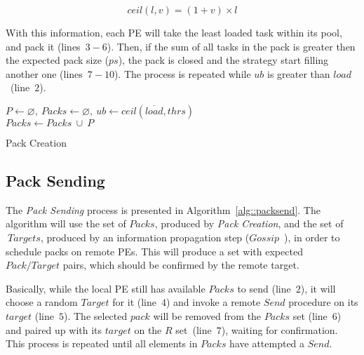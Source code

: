 \begin{equation}
	ceil(l,v) = (1+v)\times l
    \label{eq:ceil}
\end{equation}

With this information, each PE will take the least loaded task within its pool, and pack it (lines~$3-6$). %
Then, if the sum of all tasks in the pack is greater then the expected pack size ($ps$), the pack is closed and the strategy start filling another one (lines~$7-10$).
The process is repeated while $ub$ is greater than $load$~(line~$2$).

\begin{algorithm}[!ht]
    \DontPrintSemicolon
    $P \gets \varnothing,\ Packs \gets \varnothing,\ ub \gets ceil(\overline{load},thrs)$ \\
    $Packs \gets Packs\ \cup\ P$   
    \caption{Pack Creation} 
    \label{alg::packcreation}
\end{algorithm}

\subsection{Pack Sending}

The \textit{Pack Sending} process is presented in Algorithm~\ref{alg::packsend}.
The algorithm will use the set of $Packs$, produced by \textit{Pack Creation}, and the set of $\ Targets$, produced by an information propagation step ($Gossip$~\cite{gossip}), in order to schedule packs on remote PEs.
This will produce a set with expected $Pack/Target$ pairs, which should be confirmed by the remote target.

Basically, while the local PE still has available $Packs$ to send (line~$2$), it will choose a random $Target$ for it (line~$4$) and invoke a remote $Send$ procedure on its $target$ (line~$5$).
The selected $pack$ will be removed from the $Packs$ set (line~$6$) and paired up with its $target$ on the $R$ set~(line~$7$), waiting for confirmation.
This process is repeated until all elements in $Packs$ have attempted a $Send$.

